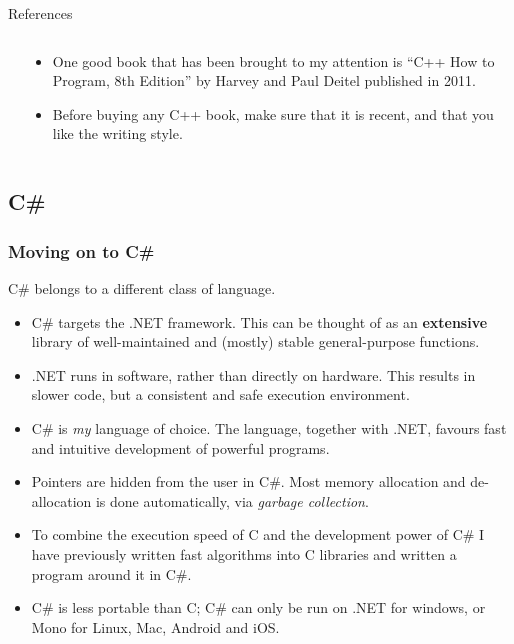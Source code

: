 \documentclass[smaller,handout,table]{beamer}
\begin{document}
\begin{frame}
\begin{exampleblock}{References}
\begin{columns}
\begin{column}{1.7cm}
\end{column}
\begin{column}{8cm}
\begin{itemize}
\item One good book that has been brought to my attention is ``C++ How to Program, 8th Edition'' by Harvey and Paul Deitel published in 2011.
\item Before buying any C++ book, make sure that it is recent, and that you like the writing style.
\end{itemize}
\end{column}
\end{columns}
\end{exampleblock}
\end{frame}

\subsection{C\#}
\begin{frame}
\frametitle{Moving on to C\#}
C\# belongs to a different class of language.
\begin{itemize}
\item C\# targets the .NET framework. This can be thought of as an \textbf{extensive} library of well-maintained and (mostly) stable general-purpose functions.
\item .NET runs in software, rather than directly on hardware. This results in slower code, but a consistent and safe execution environment.
\item C\# is \textit{my} language of choice. The language, together with .NET, favours fast and intuitive development of powerful programs.
\item Pointers are hidden from the user in C\#. Most memory allocation and de-allocation is done automatically, via \emph{garbage collection}.
\item To combine the execution speed of C and the development power of C\# I have previously written fast algorithms into C libraries and written a program around it in C\#.
\item C\# is less portable than C; C\# can only be run on .NET for windows, or Mono for Linux, Mac, Android and iOS.
\end{itemize}
\end{frame}
\end{document}
